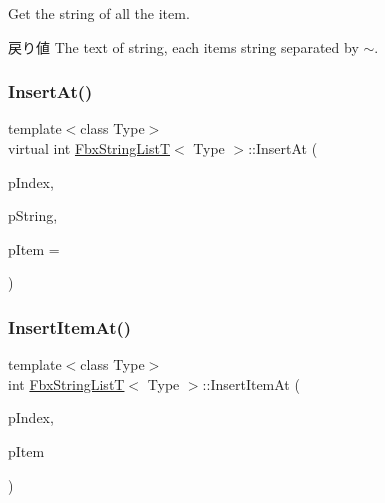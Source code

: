 Get the string of all the item. \begin{DoxyReturn}{戻り値}
The text of string, each item\textquotesingle{}s string separated by \textquotesingle{}$\sim$\textquotesingle{}. 
\end{DoxyReturn}
\mbox{\label{class_fbx_string_list_t_ad736ea0d13e3dd02874e8dff83ff41db}} 
\subsubsection{\texorpdfstring{Insert\+At()}{InsertAt()}}
{\footnotesize\ttfamily template$<$class Type$>$ \\
virtual int \hyperlink{class_fbx_string_list_t}{Fbx\+String\+ListT}$<$ Type $>$\+::Insert\+At (\begin{DoxyParamCaption}\item[{int}]{p\+Index,  }\item[{const char $\ast$}]{p\+String,  }\item[{Fbx\+Handle}]{p\+Item = {} }\end{DoxyParamCaption})\hspace{0.3cm}{\ttfamily [virtual]}}

\mbox{\label{class_fbx_string_list_t_aa9bd662d4638b711c615e37a9038a038}} 
\subsubsection{\texorpdfstring{Insert\+Item\+At()}{InsertItemAt()}}
{\footnotesize\ttfamily template$<$class Type$>$ \\
int \hyperlink{class_fbx_string_list_t}{Fbx\+String\+ListT}$<$ Type $>$\+::Insert\+Item\+At (\begin{DoxyParamCaption}\item[{int}]{p\+Index,  }\item[{Type $\ast$}]{p\+Item }\end{DoxyParamCaption})}

